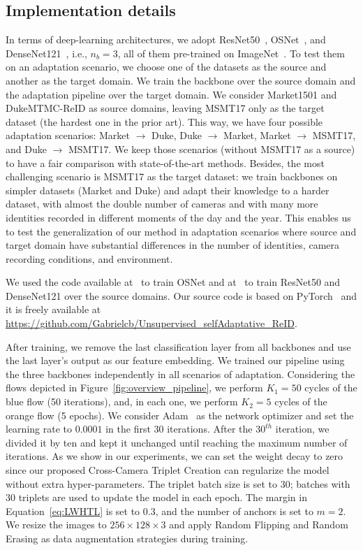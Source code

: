 \documentclass[journal]{IEEEtran}
\begin{document}
\subsection{Implementation details}
\label{subsec:implementation_details}
In terms of deep-learning architectures, we adopt ResNet50~\cite{he2016deep}, OSNet~\cite{zhou2019omni}, and DenseNet121~\cite{huang2017densely}, i.e., $n_{b} = 3$, all of them pre-trained on ImageNet~\cite{deng2009imagenet}. To test them on an adaptation scenario, we choose one of the datasets as the source and another as the target domain. We train the backbone over the source domain and the adaptation pipeline over the target domain. We consider Market1501 and DukeMTMC-ReID as source domains, leaving MSMT17 only as the target dataset (the hardest one in the prior art). This way, we have four possible adaptation scenarios: Market $\rightarrow$ Duke, Duke $\rightarrow$ Market, Market $\rightarrow$ MSMT17, and Duke $\rightarrow$ MSMT17. We keep those scenarios (without MSMT17 as a source) to have a fair comparison with state-of-the-art methods. Besides, the most challenging scenario is MSMT17 as the target dataset: we train backbones on simpler datasets (Market and Duke) and adapt their knowledge to a harder dataset, with almost the double number of cameras and with many more identities recorded in different moments of the day and the year. This enables us to test the generalization of our method in adaptation scenarios where source and target domain have substantial differences in the number of identities, camera recording conditions, and environment. 

We used the code available at~\cite{torchreid} to train OSNet and at~\cite{zhai2020multiple} to train ResNet50 and DenseNet121 over the source domains. Our source code is based on PyTorch~\cite{NEURIPS2019_9015} and it is freely available at \url{https://github.com/Gabrielcb/Unsupervised_selfAdaptative_ReID}.

After training, we remove the last classification layer from all backbones and use the last layer's output as our feature embedding. We trained our pipeline using the three backbones independently in all scenarios of adaptation. Considering the flows depicted in Figure~\ref{fig:overview_pipeline}, we perform $K_1=50$ cycles of the blue flow (50 iterations), and, in each one, we perform $K_2=5$ cycles of the orange flow (5 epochs).  We consider Adam~\cite{kingma2014adam} as the network optimizer and set the learning rate to $0.0001$ in the first 30 iterations. After the $30^{th}$ iteration, we divided it by ten and kept it unchanged until reaching the maximum number of iterations. As we show in our experiments, we can set the weight decay to zero since our proposed Cross-Camera Triplet Creation can regularize the model without extra hyper-parameters. The triplet batch size is set to 30; batches with 30 triplets are used to update the model in each epoch. The margin in Equation~\ref{eq:LWHTL} is set to $0.3$, and the number of anchors is set to $m = 2$. We resize the images to $256 \times 128 \times 3$ and apply Random Flipping and Random Erasing as data augmentation strategies during training.
 
\end{document}

